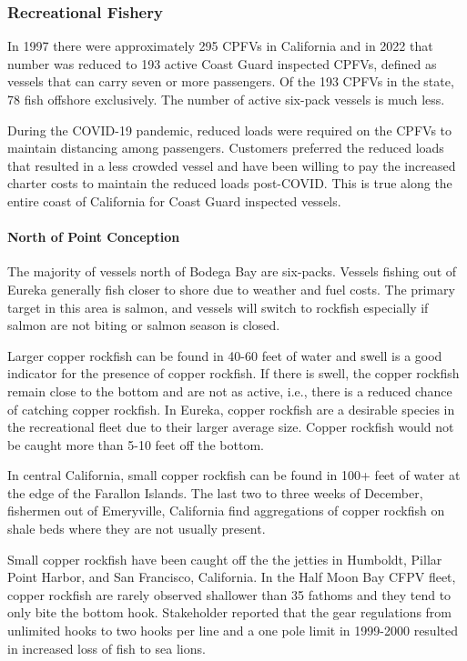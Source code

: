 \documentclass[11pt,
  english,
  letterpaper,
]{article}
\begin{document}
\hypertarget{recreational-fishery-1}{%
\subsubsection{Recreational Fishery}\label{recreational-fishery-1}}

In 1997 there were approximately 295 CPFVs in California and in 2022 that number was reduced to 193 active Coast Guard inspected CPFVs, defined as vessels that can carry seven or more passengers. Of the 193 CPFVs in the state, 78 fish offshore exclusively. The number of active six-pack vessels is much less.

During the COVID-19 pandemic, reduced loads were required on the CPFVs to maintain distancing among passengers. Customers preferred the reduced loads that resulted in a less crowded vessel and have been willing to pay the increased charter costs to maintain the reduced loads post-COVID. This is true along the entire coast of California for Coast Guard inspected vessels.

\hypertarget{north-of-point-conception}{%
\paragraph{North of Point Conception}\label{north-of-point-conception}}

The majority of vessels north of Bodega Bay are six-packs. Vessels fishing out of Eureka generally fish closer to shore due to weather and fuel costs. The primary target in this area is salmon, and vessels will switch to rockfish especially if salmon are not biting or salmon season is closed.

Larger copper rockfish can be found in 40-60 feet of water and swell is a good indicator for the presence of copper rockfish. If there is swell, the copper rockfish remain close to the bottom and are not as active, i.e., there is a reduced chance of catching copper rockfish. In Eureka, copper rockfish are a desirable species in the recreational fleet due to their larger average size. Copper rockfish would not be caught more than 5-10 feet off the bottom.

In central California, small copper rockfish can be found in 100+ feet of water at the edge of the Farallon Islands. The last two to three weeks of December, fishermen out of Emeryville, California find aggregations of copper rockfish on shale beds where they are not usually present.

Small copper rockfish have been caught off the the jetties in Humboldt, Pillar Point Harbor, and San Francisco, California. In the Half Moon Bay CFPV fleet, copper rockfish are rarely observed shallower than 35 fathoms and they tend to only bite the bottom hook. Stakeholder reported that the gear regulations from unlimited hooks to two hooks per line and a one pole limit in 1999-2000 resulted in increased loss of fish to sea lions.
\end{document}

